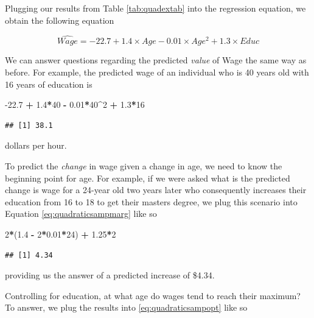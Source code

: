 \documentclass[
]{book}
\newenvironment{Shaded}{\begin{snugshade}}{\end{snugshade}}
\newcommand{\DecValTok}[1]{\textcolor[rgb]{0.00,0.00,0.81}{#1}}
\newcommand{\FloatTok}[1]{\textcolor[rgb]{0.00,0.00,0.81}{#1}}
\newcommand{\NormalTok}[1]{#1}
\newcommand{\OperatorTok}[1]{\textcolor[rgb]{0.81,0.36,0.00}{\textbf{#1}}}
\newcommand{\StringTok}[1]{\textcolor[rgb]{0.31,0.60,0.02}{#1}}
\begin{document}
Plugging our results from Table \ref{tab:quadextab} into the regression equation, we obtain the following equation

\begin{equation}
\hat{Wage} = -22.7 + 1.4\times Age - 0.01\times Age^2 + 1.3\times Educ
\label{eq:quadraticexsamp}
\end{equation}

We can answer questions regarding the predicted \emph{value} of Wage the same way as before. For example, the predicted wage of an individual who is 40 years old with 16 years of education is

\begin{Shaded}
\begin{Highlighting}[]
\FloatTok{-22.7} \OperatorTok{+}\StringTok{ }\FloatTok{1.4}\OperatorTok{*}\DecValTok{40} \OperatorTok{-}\StringTok{ }\FloatTok{0.01}\OperatorTok{*}\DecValTok{40}\OperatorTok{^}\DecValTok{2} \OperatorTok{+}\StringTok{ }\FloatTok{1.3}\OperatorTok{*}\DecValTok{16}
\end{Highlighting}
\end{Shaded}

\begin{verbatim}
## [1] 38.1
\end{verbatim}

dollars per hour.

To predict the \emph{change} in wage given a change in age, we need to know the beginning point for age. For example, if we were asked what is the predicted change is wage for a 24-year old two years later who consequently increases their education from 16 to 18 to get their masters degree, we plug this scenario into Equation \eqref{eq:quadraticsampmarg} like so

\begin{Shaded}
\begin{Highlighting}[]
\DecValTok{2}\OperatorTok{*}\NormalTok{(}\FloatTok{1.4} \OperatorTok{-}\StringTok{ }\DecValTok{2}\OperatorTok{*}\FloatTok{0.01}\OperatorTok{*}\DecValTok{24}\NormalTok{) }\OperatorTok{+}\StringTok{ }\FloatTok{1.25}\OperatorTok{*}\DecValTok{2}
\end{Highlighting}
\end{Shaded}

\begin{verbatim}
## [1] 4.34
\end{verbatim}

providing us the answer of a predicted increase of \$4.34.

Controlling for education, at what age do wages tend to reach their maximum? To answer, we plug the results into \eqref{eq:quadraticsampopt} like so
\end{document}
